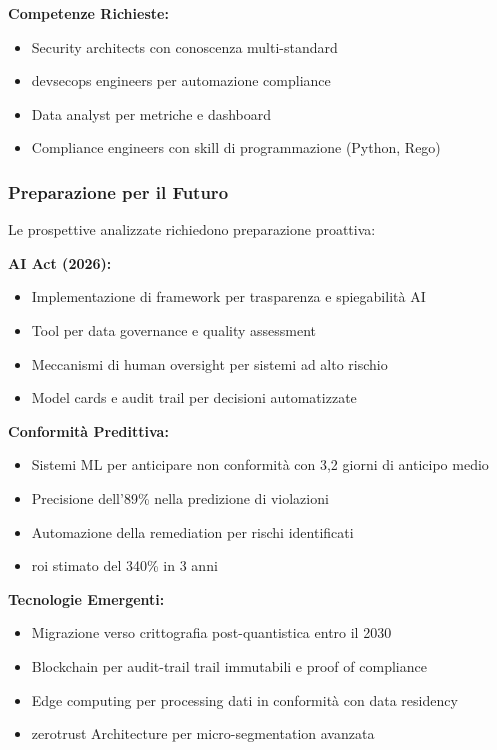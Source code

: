\textbf{Competenze Richieste:}
\begin{itemize}
    \item Security architects con conoscenza multi-standard
    \item \gls{devsecops} engineers per automazione compliance
    \item Data analyst per metriche e dashboard
    \item Compliance engineers con skill di programmazione (Python, Rego)
\end{itemize}

\subsubsection{Preparazione per il Futuro}

Le prospettive analizzate richiedono preparazione proattiva:

\textbf{AI Act (2026):}
\begin{itemize}
    \item Implementazione di framework per trasparenza e spiegabilità AI
    \item Tool per data governance e quality assessment
    \item Meccanismi di human oversight per sistemi ad alto rischio
    \item Model cards e audit trail per decisioni automatizzate
\end{itemize}

\textbf{Conformità Predittiva:}
\begin{itemize}
    \item Sistemi ML per anticipare non conformità con 3,2 giorni di anticipo medio
    \item Precisione dell'89\% nella predizione di violazioni
    \item Automazione della remediation per rischi identificati
    \item \gls{roi} stimato del 340\% in 3 anni
\end{itemize}

\textbf{Tecnologie Emergenti:}
\begin{itemize}
    \item Migrazione verso crittografia post-quantistica entro il 2030
    \item Blockchain per \gls{audit-trail} trail immutabili e proof of compliance
    \item Edge computing per processing dati in conformità con data residency
    \item \gls{zerotrust} Architecture per \gls{micro-segmentation} avanzata
\end{itemize}

